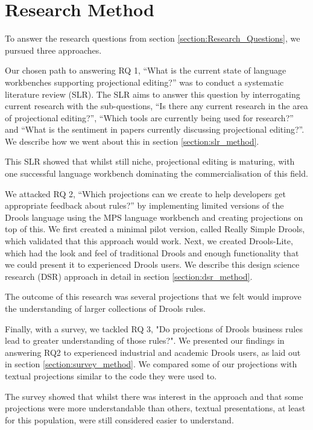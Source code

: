 \section{Research Method}
\label{section:Research_Method}

To answer the research questions from section \ref{section:Research_Questions}, we pursued three approaches.

Our chosen path to answering RQ 1, ``What is the current state of language workbenches supporting projectional editing?'' was to conduct a systematic literature review (SLR).
The SLR aims to answer this question by interrogating current research with the sub-questions, ``Is there any current research in the area of projectional editing?'',  ``Which tools are currently being used for research?'' and ``What is the sentiment in papers currently discussing projectional editing?''.
We describe how we went about this in section \ref{section:slr_method}. 

This SLR showed that whilst still niche, projectional editing is maturing, with one successful language workbench dominating the commercialisation of this field.

We attacked RQ 2, ``Which projections can we create to help developers get appropriate feedback about rules?'' by implementing limited versions of the Drools language using the MPS language workbench and creating projections on top of this.
We first created a minimal pilot version, called Really Simple Drools, which validated that this approach would work.
Next, we created Drools-Lite, which had the look and feel of traditional Drools and enough functionality that we could present it to experienced Drools users.
We describe this design science research (DSR) approach in detail in section \ref{section:dsr_method}.

The outcome of this research was several projections that we felt would improve the understanding of larger collections of Drools rules.

Finally, with a survey, we tackled RQ 3, "Do projections of Drools business rules lead to greater understanding of those rules?".
We presented our findings in answering RQ2 to experienced industrial and academic Drools users, as laid out in section \ref{section:survey_method}.
We compared some of our projections with textual projections similar to the code they were used to.

The survey showed that whilst there was interest in the approach and that some projections were more understandable than others, textual presentations, at least for this population, were still considered easier to understand.